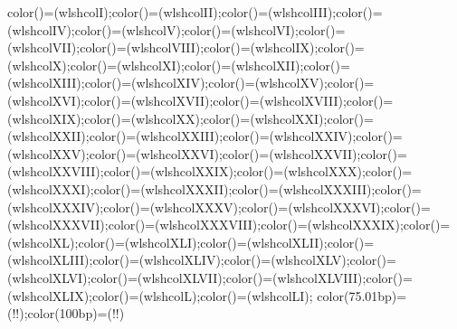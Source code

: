 {{                    color(\xI)=(wlshcolI);color(\xII)=(wlshcolII);color(\xIII)=(wlshcolIII);color(\xIV)=(wlshcolIV);color(\xV)=(wlshcolV);color(\xVI)=(wlshcolVI);color(\xVII)=(wlshcolVII);color(\xVIII)=(wlshcolVIII);color(\xIX)=(wlshcolIX);color(\xX)=(wlshcolX);color(\xXI)=(wlshcolXI);color(\xXII)=(wlshcolXII);color(\xXIII)=(wlshcolXIII);color(\xXIV)=(wlshcolXIV);color(\xXV)=(wlshcolXV);color(\xXVI)=(wlshcolXVI);color(\xXVII)=(wlshcolXVII);color(\xXVIII)=(wlshcolXVIII);color(\xXIX)=(wlshcolXIX);color(\xXX)=(wlshcolXX);color(\xXXI)=(wlshcolXXI);color(\xXXII)=(wlshcolXXII);color(\xXXIII)=(wlshcolXXIII);color(\xXXIV)=(wlshcolXXIV);color(\xXXV)=(wlshcolXXV);color(\xXXVI)=(wlshcolXXVI);color(\xXXVII)=(wlshcolXXVII);color(\xXXVIII)=(wlshcolXXVIII);color(\xXXIX)=(wlshcolXXIX);color(\xXXX)=(wlshcolXXX);color(\xXXXI)=(wlshcolXXXI);color(\xXXXII)=(wlshcolXXXII);color(\xXXXIII)=(wlshcolXXXIII);color(\xXXXIV)=(wlshcolXXXIV);color(\xXXXV)=(wlshcolXXXV);color(\xXXXVI)=(wlshcolXXXVI);color(\xXXXVII)=(wlshcolXXXVII);color(\xXXXVIII)=(wlshcolXXXVIII);color(\xXXXIX)=(wlshcolXXXIX);color(\xXL)=(wlshcolXL);color(\xXLI)=(wlshcolXLI);color(\xXLII)=(wlshcolXLII);color(\xXLIII)=(wlshcolXLIII);color(\xXLIV)=(wlshcolXLIV);color(\xXLV)=(wlshcolXLV);color(\xXLVI)=(wlshcolXLVI);color(\xXLVII)=(wlshcolXLVII);color(\xXLVIII)=(wlshcolXLVIII);color(\xXLIX)=(wlshcolXLIX);color(\xL)=(wlshcolL);color(\xLI)=(wlshcolLI);%
                    color(75.01bp)=(\pgfspectra@IRcolor!\@pgfspectra@shade@opacity!\pgfspectra@shade@opacitycolor);color(100bp)=(\pgfspectra@IRcolor!\@pgfspectra@shade@opacity!\pgfspectra@shade@opacitycolor)}%
                \else%
                    \pgfmathprintnumberto{\pgfmathresult}{\pgfspectra@shade@logscale@factor}%
                    \pgfmathprintnumberto{\pgfmathresult}{\pgfspectra@X@tmp}%
                    \ifnum{}\relax%
                    \else%
                    \fi%
                    \pgfmathprintnumberto{\pgfmathresult}{\pgfspectra@X@tmp}%
                    \edef\pgfspectra@X@UV{\pgfspectra@X@tmp bp}%
}

